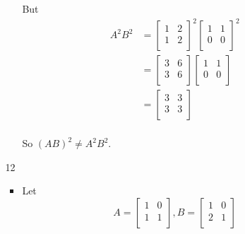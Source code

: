 \documentclass[12pt,letterpaper]{article}
\begin{document}
\begin{enumerate}
\begin{enumerate}
\begin{enumerate}[label=(\alph*)]
              But
              \begin{align*}
                A^2B^2
                &= \begin{bmatrix}
                  1 & 2 \\
                  1 & 2 \\
                \end{bmatrix}^2
                \begin{bmatrix}
                  1 & 1 \\
                  0 & 0 \\
                \end{bmatrix}^2 \\
                &= \begin{bmatrix}
                  3 & 6 \\
                  3 & 6 \\
                \end{bmatrix}
                \begin{bmatrix}
                  1 & 1 \\
                  0 & 0 \\
                \end{bmatrix} \\
                &= \begin{bmatrix}
                  3 & 3 \\
                  3 & 3 \\
                \end{bmatrix} \\
              \end{align*}

              So $(AB)^2 \ne A^2B^2$.
          \end{enumerate}
        \item [12]
          \begin{itemize}
            \item

              Let
              \[
                A = \begin{bmatrix}
                  1 & 0 \\
                  1 & 1 \\
                \end{bmatrix}
                ,
                B = \begin{bmatrix}
                  1 & 0 \\
                  2 & 1 \\
                \end{bmatrix}
              \]


\end{itemize}
\end{enumerate}
\end{enumerate}
\end{document}
